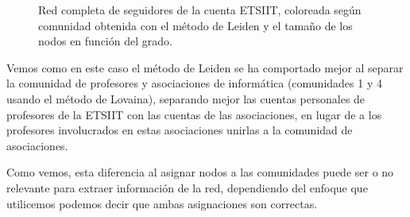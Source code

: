 \newpage
\begin{figure}[H]
	\centering
	
	\caption{Red completa de seguidores de la cuenta ETSIIT, coloreada según comunidad obtenida con el método de Leiden y el tamaño de los nodos en función del grado.}
\end{figure}
\vspace{18cm}
Vemos como en este caso el método de Leiden se ha comportado mejor al separar la comunidad de profesores y asociaciones de informática (comunidades 1 y 4 usando el método de Lovaina), separando mejor las cuentas personales de profesores de la ETSIIT con las cuentas de las asociaciones, en lugar de a los profesores involucrados en estas asociaciones unirlas a la comunidad de asociaciones.
\newpage

Como vemos, esta diferencia al asignar nodos a las comunidades puede ser o no relevante para extraer información de la red, dependiendo del enfoque que utilicemos podemos decir que ambas asignaciones son correctas.
